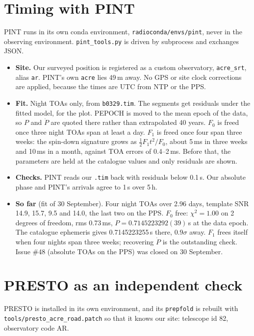 \documentclass[11pt,a4paper]{article}
\newcommand{\code}[1]{\texttt{#1}}
\begin{document}
\section{Timing with PINT}
PINT runs in its own conda environment, \code{radioconda/envs/pint}, never in the observing environment. \code{pint\_tools.py} is driven by subprocess and exchanges JSON.
\begin{itemize}
\item \textbf{Site.} Our surveyed position is registered as a custom observatory, \code{acre\_srt}, alias \code{ar}. PINT's own \code{acre} lies 49\,m away. No GPS or site clock corrections are applied, because the times are UTC from NTP or the PPS.
\item \textbf{Fit.} Night TOAs only, from \code{b0329.tim}. The segments get residuals under the fitted model, for the plot. PEPOCH is moved to the mean epoch of the data, so $P$ and $\dot P$ are quoted there rather than extrapolated 40 years. $F_0$ is freed once three night TOAs span at least a day. $F_1$ is freed once four span three weeks: the spin-down signature grows as $\tfrac12 F_1 t^2/F_0$, about 5\,ms in three weeks and 10\,ms in a month, against TOA errors of 0.4--2\,ms. Before that, the parameters are held at the catalogue values and only residuals are shown.
\item \textbf{Checks.} PINT reads our \code{.tim} back with residuals below 0.1\,\textmu s. Our absolute phase and PINT's arrivals agree to 1\,\textmu s over 5\,h.
\item \textbf{So far} (fit of 30 September). Four night TOAs over 2.96 days, template SNR 14.9, 15.7, 9.5 and 14.0, the last two on the PPS. $F_0$ free: $\chi^2 = 1.00$ on 2 degrees of freedom, rms 0.73\,ms, $P = 0.7145223292(39)$\,s at the data epoch. The catalogue ephemeris gives 0.7145223255\,s there, $0.9\sigma$ away. $F_1$ frees itself when four nights span three weeks; recovering $\dot P$ is the outstanding check. Issue \#48 (absolute TOAs on the PPS) was closed on 30 September.
\end{itemize}

\section{PRESTO as an independent check}
PRESTO is installed in its own environment, and its \code{prepfold} is rebuilt with \code{tools/presto\_acre\_road.patch} so that it knows our site: telescope id 82, observatory code AR.
\end{document}
